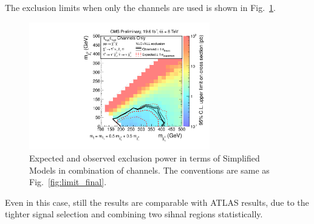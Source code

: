 The exclusion limits when only the \tauTau channels are used is shown in Fig.~\ref{fig:limit_tauTau}.
\begin{linenomath}
\begin{figure}[!htb]
\centering
\includegraphics[width=0.7\textwidth,keepaspectratio=true]{StatisticsFig/ExclusionTauTau2Bin.pdf}
\caption{Expected and observed exclusion power in terms of Simplified Models
in combination of \tauTau channels. The conventions are same as Fig.~\ref{fig:limit_final}.}
\label{fig:limit_tauTau}
\end{figure}
\end{linenomath}
Even in this case, still the results are comparable with ATLAS results, 
due to the tighter signal selection and combining two sihnal regions statistically.


